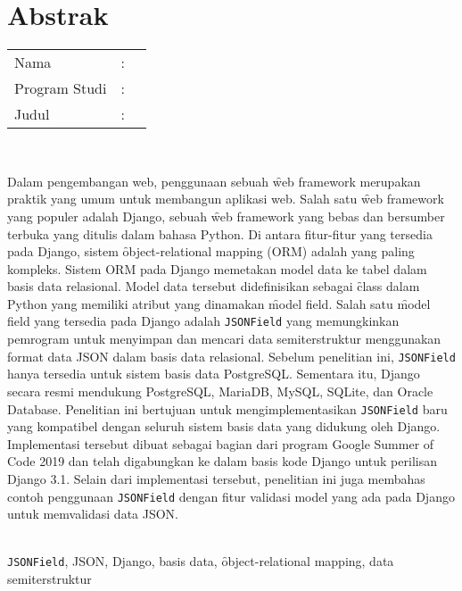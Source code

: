 %
%
%

\chapter*{Abstrak}
\singlespacing

\vspace*{0.2cm}

\noindent \begin{tabular}{@{}l l p{12.0cm}}
	Nama&: & \penulis \\
	Program Studi&: & \programIndonesia \\
	Judul&: & \judulIndonesia \\
\end{tabular} \\

\vspace*{0.5cm}

\noindent
Dalam pengembangan web, penggunaan sebuah \f{web framework} merupakan praktik
yang umum untuk membangun aplikasi web. Salah satu \f{web framework} yang
populer adalah Django, sebuah \f{web framework} yang bebas dan bersumber
terbuka yang ditulis dalam bahasa Python. Di antara fitur-fitur yang tersedia
pada Django, sistem \f{object-relational mapping} (ORM) adalah yang paling
kompleks. Sistem ORM pada Django memetakan model data ke tabel dalam basis data
relasional. Model data tersebut didefinisikan sebagai \f{class} dalam Python
yang memiliki atribut yang dinamakan \f{model field}. Salah satu \f{model
field} yang tersedia pada Django adalah \verb|JSONField| yang memungkinkan
pemrogram untuk menyimpan dan mencari data semiterstruktur menggunakan format
data JSON dalam basis data relasional. Sebelum penelitian ini, \verb|JSONField|
hanya tersedia untuk sistem basis data PostgreSQL. Sementara itu, Django secara
resmi mendukung PostgreSQL, MariaDB, MySQL, SQLite, dan Oracle Database.
Penelitian ini bertujuan untuk mengimplementasikan \verb|JSONField| baru yang
kompatibel dengan seluruh sistem basis data yang didukung oleh Django.
Implementasi tersebut dibuat sebagai bagian dari program Google Summer of Code
2019 dan telah digabungkan ke dalam basis kode Django untuk perilisan Django
3.1. Selain dari implementasi tersebut, penelitian ini juga membahas contoh
penggunaan \verb|JSONField| dengan fitur validasi model yang ada pada Django
untuk memvalidasi data JSON. \\

\vspace*{0.2cm}

\noindent {} \\
\verb|JSONField|, JSON, Django, basis data, \f{object-relational mapping}, data
semiterstruktur \\

\onehalfspacing
\newpage
